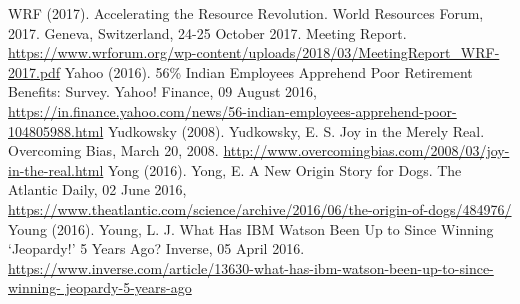 \begin{multicols}{2}
\begin{thebibliography}{99}
 WRF (2017). Accelerating the Resource Revolution. World Resources Forum, 2017. Geneva, Switzerland, 24-25 October 2017. Meeting Report. \url{https://www.wrforum.org/wp-content/uploads/2018/03/MeetingReport_WRF-2017.pdf}
 Yahoo (2016). 56\% Indian Employees Apprehend Poor Retirement Benefits: Survey. Yahoo! Finance, 09 August 2016, \url{https://in.finance.yahoo.com/news/56-indian-employees-apprehend-poor-104805988.html}
 Yudkowsky (2008). Yudkowsky, E. S. Joy in the Merely Real. Overcoming Bias, March 20, 2008. \url{http://www.overcomingbias.com/2008/03/joy-in-the-real.html}
 Yong (2016). Yong, E. A New Origin Story for Dogs. The Atlantic Daily, 02 June 2016, \url{https://www.theatlantic.com/science/archive/2016/06/the-origin-of-dogs/484976/}
 Young (2016). Young, L. J. What Has IBM Watson Been Up to Since Winning ‘Jeopardy!’ 5 Years Ago? Inverse, 05 April 2016. \url{https://www.inverse.com/article/13630-what-has-ibm-watson-been-up-to-since-winning- jeopardy-5-years-ago}
\end{thebibliography}
\end{multicols}

\bigskip

